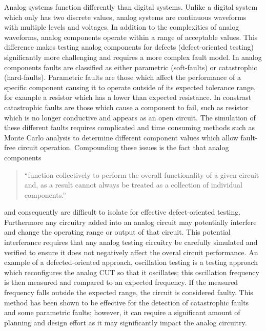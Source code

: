 \documentclass[12pt]{report}
\begin{document}
Analog systems function differently than digital systems.  Unlike a digital system which only has two discrete values, analog systems are continuous waveforms with multiple levels and voltages\cite{syschip}.  In addition to the complexities of analog waveforms, analog components operate within a range of acceptable values\cite{syschip}.  This difference makes testing analog components for defects (defect-oriented testing) significantly more challenging and requires a more complex fault model.  In analog components faults are classified as either parametric (soft-faults) or catastrophic (hard-faults)\cite{analogfaults}.  Parametric faults are those which affect the performance of a specific component causing it to operate outside of its expected tolerance range, for example a resistor which has a lower than expected resistance.  In constrast catastrophic faults are those which cause a component to fail, such as resistor which is no longer conductive and appears as an open circuit\cite{analogfaults}.  The simulation of these different faults requires complicated and time consuming methods such as Monte Carlo analysis to determine different component values which allow fault-free circuit operation\cite{syschip}.  Compounding these issues is the fact that analog components
\begin{quote}
``function collectively to perform the overall functionality of a given circuit and, as a result cannot always be treated as a collection of individual components\cite{syschip}.''
\end{quote}
and consequently are difficult to isolate for effective defect-oriented testing\cite{analogmixedtest}.  Furthermore any circuitry added into an analog circuit may potentially interfere and change the operating range or output of that circuit\cite{syschip}.  This potential interferance requires that any analog testing circuitry be carefully simulated and verified to ensure it does not negatively affect the overal circuit performance.  An example of a defected-oriented approach, oscillation testing is a testing approach which reconfigures the analog CUT so that it oscillates; this oscillation frequency is then measured and compared to an expected frequency.  If the measured frequency falls outside the expected range, the circuit is considered faulty\cite{analogosc}.  This method has been shown to be effective for the detection of catastrophic faults and some parametric faults; however, it can require a significant amount of planning and design effort as it may significantly impact the analog circuitry\cite{analogosc}\cite{syschip}.
\end{document}

